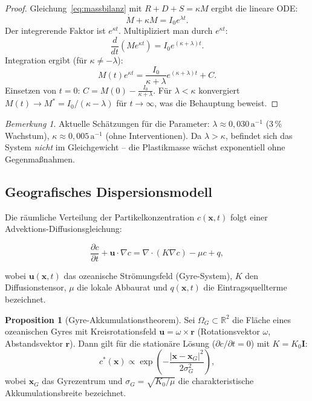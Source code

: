 ﻿\documentclass[12pt,a4paper]{article}
\theoremstyle{definition}
\newtheorem{proposition}{Proposition}[section]
\theoremstyle{remark}
\newtheorem{bemerkung}{Bemerkung}[section]
\begin{document}
\begin{proof}
Gleichung~\eqref{eq:massbilanz} mit $R + D + S = \kappa M$ ergibt die lineare ODE:
\begin{equation}
  \dot{M} + \kappa M = I_0 e^{\lambda t}.
\end{equation}
Der integrerende Faktor ist $e^{\kappa t}$. Multipliziert man durch $e^{\kappa t}$:
\begin{equation}
  \frac{d}{dt}(M e^{\kappa t}) = I_0 e^{(\kappa + \lambda)t}.
\end{equation}
Integration ergibt (f\"ur $\kappa \neq -\lambda$):
\begin{equation}
  M(t) e^{\kappa t} = \frac{I_0}{\kappa + \lambda} e^{(\kappa+\lambda)t} + C.
\end{equation}
Einsetzen von $t = 0$: $C = M(0) - \frac{I_0}{\kappa + \lambda}$.
F\"ur $\lambda < \kappa$ konvergiert $M(t) \to M^* = I_0 / (\kappa - \lambda)$
f\"ur $t \to \infty$, was die Behauptung beweist.
\end{proof}

\begin{bemerkung}
Aktuelle Sch\"atzungen f\"ur die Parameter: $\lambda \approx 0{,}030\,\text{a}^{-1}$
(3\,\%\,Wachstum), $\kappa \approx 0{,}005\,\text{a}^{-1}$ (ohne Interventionen).
Da $\lambda > \kappa$, befindet sich das System \emph{nicht} im Gleichgewicht --
die Plastikmasse w\"achst exponentiell ohne Gegenma\ss{}nahmen.
\end{bemerkung}

\subsection{Geografisches Dispersionsmodell}
\label{sec:geomodell}

Die r\"aumliche Verteilung der Partikelkonzentration $c(\mathbf{x}, t)$ folgt
einer Advektions-Diffusions\-gleichung:

\begin{equation}
  \frac{\partial c}{\partial t} + \mathbf{u} \cdot \nabla c = \nabla \cdot (K \nabla c) - \mu c + q,
  \label{eq:advdiff}
\end{equation}

wobei $\mathbf{u}(\mathbf{x},t)$ das ozeanische Str\"omungsfeld (Gyre-System),
$K$ den Diffusionstensor, $\mu$ die lokale Abbaurat und $q(\mathbf{x},t)$
die Eintragsquellterme bezeichnet.

\begin{proposition}[Gyre-Akkumulationstheorem]
Sei $\Omega_G \subset \mathbb{R}^2$ die Fl\"ache eines ozeanischen Gyres mit
Kreisrotationsfeld $\mathbf{u} = \omega \times \mathbf{r}$ (Rotationsvektor
$\omega$, Abstandsvektor $\mathbf{r}$). Dann gilt f\"ur die station\"are
L\"osung ($\partial c / \partial t = 0$) mit $K = K_0 \mathbf{I}$:
\begin{equation}
  c^*(\mathbf{x}) \propto \exp\!\left(-\frac{|\mathbf{x} - \mathbf{x}_G|^2}{2\sigma_G^2}\right),
  \label{eq:gauss_acc}
\end{equation}
wobei $\mathbf{x}_G$ das Gyrezentrum und $\sigma_G = \sqrt{K_0 / \mu}$
die charakteristische Akkumulationsbreite bezeichnet.
\end{proposition}
\end{document}
